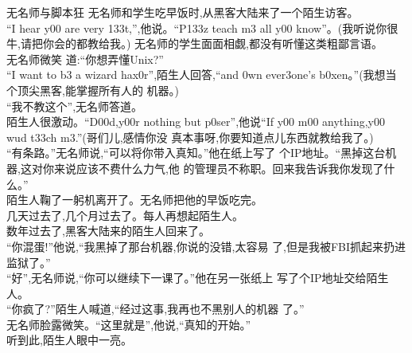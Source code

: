 \begin{frame}{无名师与脚本狂}
无名师和学生吃早饭时,从黑客大陆来了一个陌生访客。\\
 “I hear y00 are very 133t,”,他说。“P133z teach m3 all y00 know”。(我听说你很牛,请把你会的都教给我。) 无名师的学生面面相觑,都没有听懂这类粗鄙言语。\\
 无名师微笑 道:“你想弄懂Unix?” \\
 “I want to b3 a wizard hax0r”,陌生人回答,“and 0wn ever3one’s b0xen。”(我想当个顶尖黑客,能掌握所有人的 机器。) \\
 “我不教这个”,无名师答道。\\
  陌生人很激动。“D00d,y00r nothing but p0ser”,他说“If y00 m00 anything,y00 wud t33ch m3.”(哥们儿,感情你没 真本事呀,你要知道点儿东西就教给我了。) \\
  “有条路。”无名师说,“可以将你带入真知。”他在纸上写了 个IP地址。“黑掉这台机器,这对你来说应该不费什么力气,他 的管理员不称职。回来我告诉我你发现了什么。”\\
   陌生人鞠了一躬机离开了。无名师把他的早饭吃完。\\
    几天过去了,几个月过去了。每人再想起陌生人。\\
     数年过去了,黑客大陆来的陌生人回来了。 \\
     “你混蛋!”他说,“我黑掉了那台机器,你说的没错,太容易 了,但是我被FBI抓起来扔进监狱了。”\\
      “好”,无名师说,“你可以继续下一课了。”他在另一张纸上 写了个IP地址交给陌生人。 \\
      “你疯了?”陌生人喊道,“经过这事,我再也不黑别人的机器 了。”\\
       无名师脸露微笑。“这里就是”,他说,“真知的开始。”\\
        听到此,陌生人眼中一亮。
\end{frame}